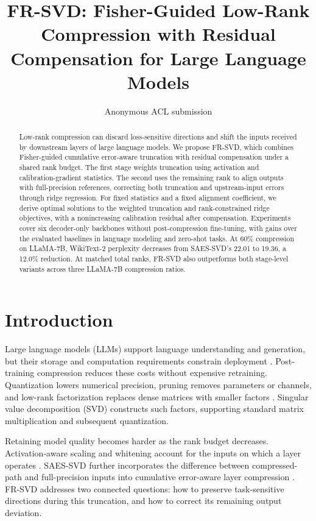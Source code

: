 \documentclass[11pt]{article}
\title{FR-SVD: Fisher-Guided Low-Rank Compression with Residual Compensation for Large Language Models}
\author{Anonymous ACL submission}
\begin{document}
\raggedbottom
\maketitle

\begin{abstract}
Low-rank compression can discard loss-sensitive directions and shift the inputs received by downstream layers of large language models. We propose FR-SVD, which combines Fisher-guided cumulative error-aware truncation with residual compensation under a shared rank budget. The first stage weights truncation using activation and calibration-gradient statistics. The second uses the remaining rank to align outputs with full-precision references, correcting both truncation and upstream-input errors through ridge regression. For fixed statistics and a fixed alignment coefficient, we derive optimal solutions to the weighted truncation and rank-constrained ridge objectives, with a nonincreasing calibration residual after compensation. Experiments cover six decoder-only backbones without post-compression fine-tuning, with gains over the evaluated baselines in language modeling and zero-shot tasks. At 60\% compression on LLaMA-7B, WikiText-2 perplexity decreases from SAES-SVD's 22.01 to 19.36, a 12.0\% reduction. At matched total ranks, FR-SVD also outperforms both stage-level variants across three LLaMA-7B compression ratios.
\end{abstract}

\section{Introduction}\label{sec:intro}

Large language models (LLMs) support language understanding and generation, but their storage and computation requirements constrain deployment \citep{touvron2023llama,touvron2023llama2,dubey2024llama3}. Post-training compression reduces these costs without expensive retraining. Quantization lowers numerical precision, pruning removes parameters or channels, and low-rank factorization replaces dense matrices with smaller factors \citep{frantar2023gptq,lin2023awq,frantar2023sparsegpt,ma2023llmpruner,ashkboos2024slicegpt}. Singular value decomposition (SVD) constructs such factors, supporting standard matrix multiplication and subsequent quantization.

Retaining model quality becomes harder as the rank budget decreases. Activation-aware scaling and whitening account for the inputs on which a layer operates \citep{yuan2023asvd,wang2025svdllm,wang2025svdllmv2}. SAES-SVD further incorporates the difference between compressed-path and full-precision inputs into cumulative error-aware layer compression \citep{hu2026saessvd}. FR-SVD addresses two connected questions: how to preserve task-sensitive directions during this truncation, and how to correct its remaining output deviation.
\end{document}
